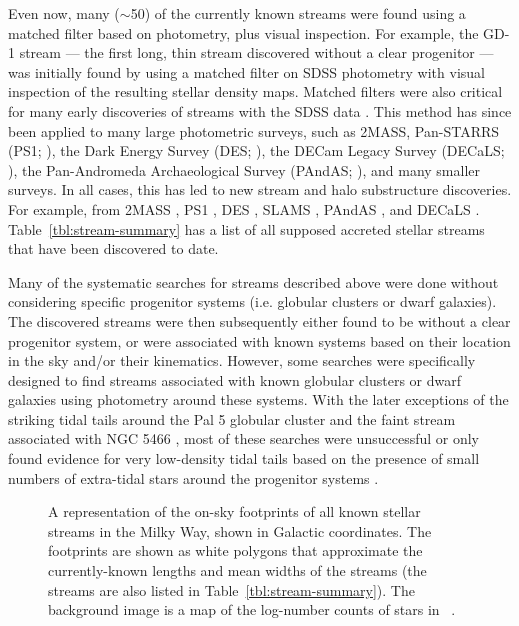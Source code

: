 \documentclass[final,5p,times,twocolumn,authoryear]{elsarticle}
\begin{document}
Even now, many ($\sim$50) of the currently known streams were found using a matched
filter based on photometry, plus visual inspection.
For example, the GD-1 stream --- the first long, thin stream discovered without a clear
progenitor --- was initially found by \citet{grillmair:2006-gd1} using a matched filter
on SDSS photometry with visual inspection of the resulting stellar density maps.
Matched filters were also critical for many early discoveries of streams with the SDSS
data \citep[e.g.,][]{Newberg:2002, Yanny:2003, Belokurov:2006, grillmair:2006-orphan}.
This method has since been applied to many large photometric surveys, such as 2MASS,
Pan-STARRS (PS1; \citealt{chambers:2016}), the Dark Energy Survey (DES;
\citealt{des:2005, des:2016}), the DECam Legacy Survey  (DECaLS; \citealt{dey:2019}),
the Pan-Andromeda Archaeological Survey (PAndAS; \citealt{mcconnachie:2009}),
and many smaller surveys.
In all cases, this has led to new stream and halo substructure discoveries.
For example, from 2MASS \citep{rocha-pinto:2003, rocha-pinto:2004}, PS1
\citep{bernard:2014, bernard:2016, navarrete:2017}, DES \citep{shipp:2018}, SLAMS
\citep{jethwa:2018}, PAndAS \citep{martin:2014}, and DECaLS \citep{shipp:2020}.
Table~\ref{tbl:stream-summary} has a list of all supposed accreted stellar streams that
have been discovered to date.

Many of the systematic searches for streams described above were done without
considering specific progenitor systems (i.e. globular clusters or dwarf galaxies).
The discovered streams were then subsequently either found to be without a clear
progenitor system, or were associated with known systems based on their location in the
sky and/or their kinematics.
However, some searches were specifically designed to find streams associated with known
globular clusters or dwarf galaxies \citep[e.g.,][]{grillmair:1995, kuhn:1996,
leon:2000} using photometry around these systems.
With the later exceptions of the striking tidal tails around the Pal 5 globular cluster
\citep{odenkirchen:2001} and the faint stream associated with NGC 5466
\citep{grillmair:2006-ngc5466}, most of these searches were unsuccessful or only found
evidence for very low-density tidal tails based on the presence of small numbers of
extra-tidal stars around the progenitor systems \citep{grillmair:1995, leon:2000}.

\begin{figure}[t!]
\begin{center}
\end{center}
\caption{%
A representation of the on-sky footprints of all known stellar streams in the Milky Way,
shown in Galactic coordinates.
The footprints are shown as white polygons that approximate the currently-known lengths
and mean widths of the streams (the streams are also listed in
Table~\ref{tbl:stream-summary}).
The background image is a map of the log-number counts of stars in \gaia\ .
\label{fig:sky-map}
}
\end{figure}
\end{document}
